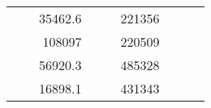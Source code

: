\begin{table}[H]
\begin{tabular}{|ccrccrccc}
\multicolumn{1}{|c|}{\cellcolor[HTML]{FFFFC7}}                                & \multicolumn{1}{c|}{\cellcolor[HTML]{DAE8FC}}                      & \multicolumn{1}{r|}{\cellcolor[HTML]{DAE8FC}35462.6}   & \multicolumn{1}{c|}{\cellcolor[HTML]{FFFFC7}}                                & \multicolumn{1}{c|}{\cellcolor[HTML]{DAE8FC}}                       & \multicolumn{1}{r|}{\cellcolor[HTML]{DDFDFF}221356}    &                                                                              &                                                                    &                                                        \\ \cline{3-3} \cline{6-6}
\multicolumn{1}{|c|}{\cellcolor[HTML]{FFFFC7}}                                & \multicolumn{1}{c|}{\cellcolor[HTML]{DAE8FC}}                      & \multicolumn{1}{r|}{\cellcolor[HTML]{DDFDFF}108097}    & \multicolumn{1}{c|}{\cellcolor[HTML]{FFFFC7}}                                & \multicolumn{1}{c|}{\cellcolor[HTML]{DAE8FC}}                       & \multicolumn{1}{r|}{\cellcolor[HTML]{DAE8FC}220509}    &                                                                              &                                                                    &                                                        \\ \cline{3-3} \cline{6-6}
\multicolumn{1}{|c|}{\cellcolor[HTML]{FFFFC7}}                                & \multicolumn{1}{c|}{\cellcolor[HTML]{DAE8FC}}                      & \multicolumn{1}{r|}{\cellcolor[HTML]{DAE8FC}56920.3}   & \multicolumn{1}{c|}{\cellcolor[HTML]{FFFFC7}}                                & \multicolumn{1}{c|}{\cellcolor[HTML]{DAE8FC}}                       & \multicolumn{1}{r|}{\cellcolor[HTML]{DDFDFF}485328}    &                                                                              &                                                                    &                                                        \\ \cline{3-3} \cline{6-6}
\multicolumn{1}{|c|}{\cellcolor[HTML]{FFFFC7}}                                & \multicolumn{1}{c|}{\cellcolor[HTML]{DAE8FC}}                      & \multicolumn{1}{r|}{\cellcolor[HTML]{DDFDFF}16898.1}   & \multicolumn{1}{c|}{\cellcolor[HTML]{FFFFC7}}                                & \multicolumn{1}{c|}{\cellcolor[HTML]{DAE8FC}}                       & \multicolumn{1}{r|}{\cellcolor[HTML]{DAE8FC}431343}    &                                                                              &                                                                    &                                                        \\ \cline{3-3} \cline{6-6}

\end{tabular}
\end{table}
